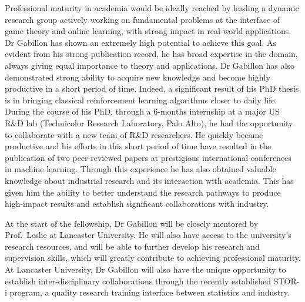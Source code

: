 Professional maturity in academia would be ideally reached by leading a dynamic research group actively working on fundamental problems at the interface of game theory and online learning, with strong impact in real-world applications. Dr Gabillon has shown an extremely high potential to achieve this goal. As evident from his strong publication record, he has broad expertise in the domain, always giving equal importance to theory and applications. Dr Gabillon has also demonstrated strong ability to acquire new knowledge  and become highly productive in a short period of time. Indeed, a significant result of his PhD thesis is in bringing classical reinforcement learning algorithms closer to daily life. 
During the course of his PhD, through a 6-months internship at a major US R\&D lab (Technicolor Research Laboratory, Palo Alto), he had the opportunity to collaborate with a new team of R\&D researchers. He quickly became productive and his efforts in this short period of time have resulted in the publication of two peer-reviewed papers at prestigious international conferences in machine learning. Through this experience he has also obtained valuable knowledge about industrial research and its interaction with academia. This has given him the ability to better understand the research pathways to produce high-impact results and establish significant collaborations with industry.

At the start of the fellowship, Dr Gabillon will be closely mentored by Prof.\ Leslie at Lancaster University. He will also have access to the university's research resources, and will be able to further develop his research and supervision skills, which will greatly contribute to achieving professional maturity. At Lancaster University, Dr Gabillon will also have the unique opportunity to establish inter-disciplinary collaborations through the recently established STOR-i program, a quality research training interface between statistics and industry. 